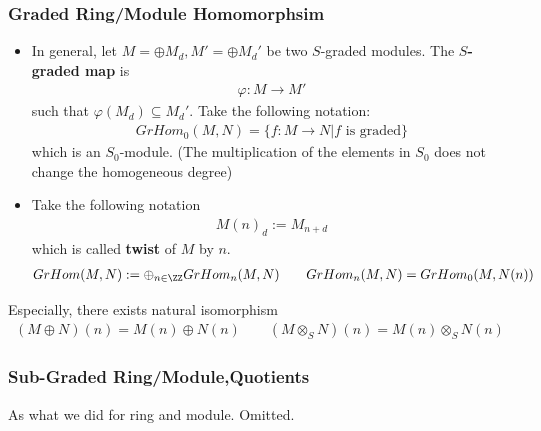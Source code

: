 \documentclass[Total.tex]{subfiles}
\begin{document}
			\subsubsection{Graded Ring/Module Homomorphsim}
			\begin{Def}
				\begin{itemize}
					\item In general, let $M=\oplus M_d,M'=\oplus M_d'$ be two $S$-graded modules. The \textbf{$S$-graded map} is 
					\begin{gather*}
						\varphi:M\rightarrow M'
					\end{gather*}
					such that $\varphi(M_d)\subseteq M_d'$. 
					Take the following notation:
					\begin{gather*}
						GrHom_0(M,N)=\{f:M\rightarrow N|f\mbox{ is graded}\}
					\end{gather*}
					which is an $S_0$-module. (The multiplication of the elements in $S_0$ does not change the homogeneous degree)
					\item Take the following notation
					\begin{gather*}
						M(n)_d:=M_{n+d}
					\end{gather*}
					which is called \textbf{twist} of $M$ by $n$.
					\begin{gather*}
						GrHom(M,N):=\oplus_{n\in \ZZ} GrHom_n(M,N)\qquad GrHom_n(M,N)=GrHom_0(M,N(n))
					\end{gather*}
				\end{itemize}
			\end{Def}
			Especially, there exists natural isomorphism
			\begin{gather*}
				(M\oplus N)(n)=M(n)\oplus N(n)\qquad (M\otimes_S N)(n)=M(n)\otimes_S N(n)
			\end{gather*}
			\subsubsection{Sub-Graded Ring/Module,Quotients}
			As what we did for ring and module. Omitted.
\end{document}
